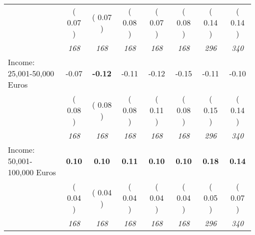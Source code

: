 \begin{tabular}{l c c c c c c c}
& (     0.07 ) & (     0.07 ) & (     0.08 ) & (     0.07 ) & (     0.08 ) & (     0.14 ) & (     0.14 ) \\
& \textit{ 168 } & \textit{ 168 } & \textit{ 168 } & \textit{ 168 } & \textit{ 168 } & \textit{ 296 } & \textit{ 340 } \\
Income: 25,001-50,000 Euros &     -0.07 & \textbf{     -0.12 } &     -0.11 &     -0.12 &     -0.15 &     -0.11 &     -0.10 \\
& (     0.08 ) & (     0.08 ) & (     0.08 ) & (     0.11 ) & (     0.08 ) & (     0.15 ) & (     0.14 ) \\
& \textit{ 168 } & \textit{ 168 } & \textit{ 168 } & \textit{ 168 } & \textit{ 168 } & \textit{ 296 } & \textit{ 340 } \\
Income: 50,001-100,000 Euros & \textbf{      0.10 } & \textbf{      0.10 } & \textbf{      0.11 } & \textbf{     0.10} & \textbf{     0.10} & \textbf{      0.18 } & \textbf{      0.14 } \\
& (     0.04 ) & (     0.04 ) & (     0.04 ) & (     0.04 ) & (     0.04 ) & (     0.05 ) & (     0.07 ) \\
& \textit{ 168 } & \textit{ 168 } & \textit{ 168 } & \textit{ 168 } & \textit{ 168 } & \textit{ 296 } & \textit{ 340 } \\
\bottomrule
\end{tabular}
